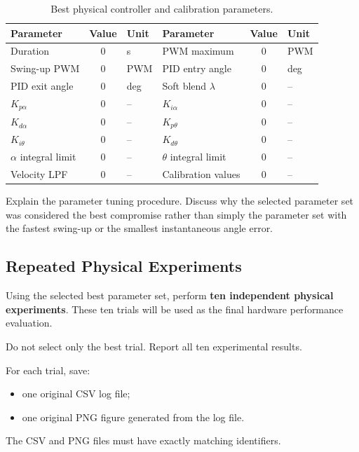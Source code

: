 \documentclass[11pt,a4paper]{article}
\begin{document}
\begin{table}[H]
\centering
\caption{Best physical controller and calibration parameters.}
\label{tab:best_parameters}
\small
\begin{tabularx}{\linewidth}{l S[table-format=4.3] l l S[table-format=4.3] l}
\toprule
Parameter & {Value} & Unit & Parameter & {Value} & Unit\\
\midrule
Duration & 0 & s & PWM maximum & 0 & PWM\\
Swing-up PWM & 0 & PWM & PID entry angle & 0 & deg\\
PID exit angle & 0 & deg & Soft blend $\lambda$ & 0 & --\\
$K_{p\alpha}$ & 0 & -- & $K_{i\alpha}$ & 0 & --\\
$K_{d\alpha}$ & 0 & -- & $K_{p\theta}$ & 0 & --\\
$K_{i\theta}$ & 0 & -- & $K_{d\theta}$ & 0 & --\\
$\alpha$ integral limit & 0 & -- & $\theta$ integral limit & 0 & --\\
Velocity LPF & 0 & -- & Calibration values & 0 & --\\
\bottomrule
\end{tabularx}
\end{table}

Explain the parameter tuning procedure. Discuss why the selected parameter
set was considered the best compromise rather than simply the parameter set
with the fastest swing-up or the smallest instantaneous angle error.


\subsection{Repeated Physical Experiments}

Using the selected best parameter set, perform \textbf{ten independent physical
experiments}. These ten trials will be used as the final hardware performance
evaluation.

Do not select only the best trial. Report all ten experimental results.

For each trial, save:

\begin{itemize}
    \item one original CSV log file;
    \item one original PNG figure generated from the log file.
\end{itemize}

The CSV and PNG files must have exactly matching identifiers.
\end{document}
